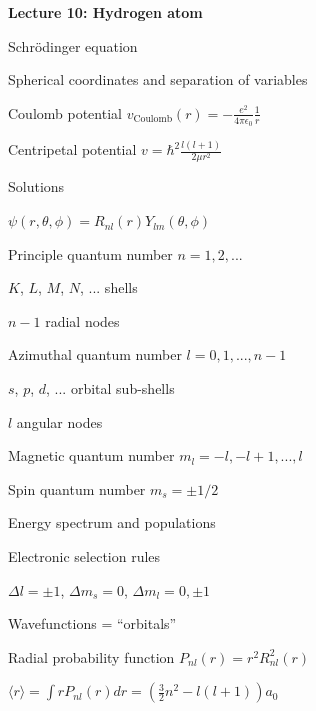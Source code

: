 \message{ !name(Outline.tex)}\documentclass[11pt]{article}
\begin{document}
\begin{outline}
\item{{\bf Lecture 10: Hydrogen atom}}
  \begin{outline}
  \item Schr\"odinger equation
    \begin{outline}
    \item Spherical coordinates and separation of variables
    \item Coulomb potential $v_\mathrm{Coulomb}(r)=-\frac{e^2}{4\pi\epsilon_0}\frac{1}{r}$
    \item Centripetal potential  $v=\hbar^2\frac{l(l+1)}{2\mu r^2}$
    \end{outline}
    \item Solutions
    \begin{outline}
  \item{$\psi(r,\theta,\phi)=R_{nl}(r)Y_{lm}(\theta,\phi)$}
  \item Principle quantum number $n=1,2,...$
    \begin{outline}
    \item $K$, $L$, $M$, $N$, ... shells
    \item $n-1$ radial nodes
    \end{outline}
  \item Azimuthal quantum number $l=0,1,...,n-1$
    \begin{outline}
    \item $s$, $p$, $d$, ... orbital sub-shells
    \item $l$ angular nodes
    \end{outline}
  \item Magnetic quantum number $m_l=-l,-l+1,...,l$
  \item Spin quantum number $m_s=\pm 1/2$
    \end{outline}
  \item Energy spectrum and populations
  \item Electronic selection rules
    \begin{outline}
    \item $\Delta l=\pm 1$, $\Delta m_s =0$, $\Delta m_l = 0,\pm 1$
    \end{outline}
  \item Wavefunctions = ``orbitals''
  \item Radial probability function $P_{nl}(r)=r^2 R_{nl}^2(r)$
    \begin{outline}
    \item $\langle r\rangle = \int r P_{nl}(r) dr = (\frac{3}{2}n^2-l(l+1))a_0$
    \end{outline}

\end{outline}
\end{outline}
\end{document}
